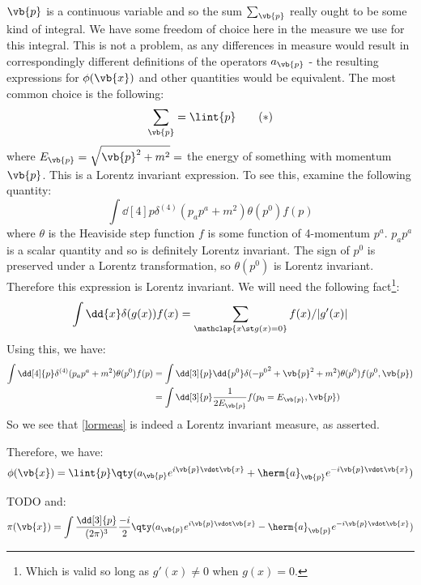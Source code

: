\documentclass{jknotes} %
\begin{document}
\(\vb{p}\) is a continuous variable and so the sum \(\sum_{\vb{p}}\) really ought to be some kind of integral. We have some freedom of choice here in the measure we use for this integral. This is not a problem, as any differences in measure would result in correspondingly different definitions of the operators \(a_{\vb{p}}\) - the resulting expressions for \(\phi(\vb{x})\) and other quantities would be equivalent. The most common choice is the following:
\begin{equation}
    \sum_{\vb{p}} = \lint{p} \tag{\(*\)}
    \label{lormeas}
\end{equation}
where \(E_{\vb{p}} = \sqrt{\vb{p}^2 + m^2} = \) the energy of something with momentum \(\vb{p}\). This is a Lorentz invariant expression. To see this, examine the following quantity:
\begin{equation}
    \int\dd[4]{p}\delta^{(4)}(p_ap^a+m^2)\theta(p^0)f(p)
\end{equation}
where \(\theta\) is the Heaviside step function \(f\) is some function of 4-momentum \(p^a\). \(p_ap^a\) is a scalar quantity and so is definitely Lorentz invariant. The sign of \(p^0\) is preserved under a Lorentz transformation, so \(\theta(p^0)\) is Lorentz invariant. Therefore this expression is Lorentz invariant. We will need the following fact\footnote{Which is valid so long as \(g'(x) \ne 0\) when \(g(x)=0\).}:
\begin{equation}
    \int\dd{x}\delta(g(x))f(x) = \sum_{\mathclap{x\st g(x)=0}} f(x)/|g'(x)|
\end{equation}
Using this, we have:
\begin{align}
    \int\dd[4]{p}\delta^{(4)}(p_ap^a+m^2)\theta(p^0)f(p) &= \int\dd[3]{p}\dd{p^0}\delta(-{p^0}^2 + \vb{p}^2 + m^2)\theta(p^0)f(p^0,\vb{p}) \\
    &= \int\dd[3]{p}\frac{1}{2E_{\vb{p}}}f(p_0=E_{\vb{p}},\vb{p})
\end{align}
So we see that \eqref{lormeas} is indeed a Lorentz invariant measure, as asserted.

Therefore, we have:
\begin{equation}
    \phi(\vb{x}) = \lint{p} \qty(a_{\vb{p}} e^{i\vb{p}\vdot\vb{x}} + \herm{a}_{\vb{p}} e^{-i\vb{p}\vdot\vb{x}})
\end{equation}

TODO
and:
\begin{equation}
    \pi(\vb{x}) = \int \frac{\dd[3]{p}}{(2\pi)^3}\frac{-i}{2}\qty(a_{\vb{p}} e^{i\vb{p}\vdot\vb{x}} - \herm{a}_{\vb{p}} e^{-i\vb{p}\vdot\vb{x}})
\end{equation}
\end{document}
